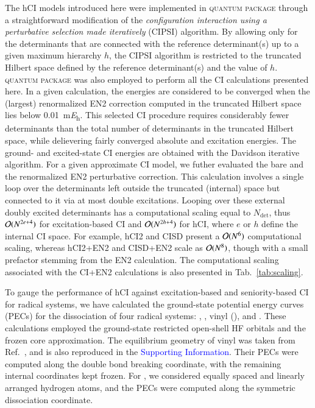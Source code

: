\documentclass[aip,jcp,reprint,noshowkeys,superscriptaddress]{revtex4-1}
\newcommand{\SupInf}{\textcolor{blue}{Supporting Information}}
\newcommand{\QP}{\textsc{quantum package}}
\newcommand{\Ndet}{N_\text{det}}
\begin{document}
The hCI models introduced here were implemented in {\QP} \cite{Garniron_2019} through a straightforward modification of the
\textit{configuration interaction using a perturbative selection made iteratively} (CIPSI) algorithm. \cite{Huron_1973,Giner_2013,Giner_2015,Garniron_2018}
By allowing only for the determinants that are connected with the reference determinant(s) up to a given maximum hierarchy $h$,
the CIPSI algorithm is restricted to the truncated Hilbert space defined by the reference determinant(s) and the value of $h$.
{\QP} \cite{Garniron_2019} was also employed to perform all the CI calculations presented here.
In a given calculation, the energies are considered to be converged when the (largest) renormalized EN2 correction computed in the truncated Hilbert space 
lies below \SI{0.01}{\milli\hartree}. \cite{Garniron_2018}
This selected CI procedure requires considerably fewer determinants than the total number of determinants in the truncated Hilbert space,
while delievering fairly converged absolute and excitation energies.
The ground- and excited-state CI energies are obtained with the Davidson iterative algorithm. \cite{Davidson_1975}
For a given approximate CI model, we futher evaluated the bare and the renormalized EN2 perturbative correction. \cite{Garniron_2019} 
This calculation involves a single loop over the determinants left outside the truncated (internal) space but connected to it via at most double excitations.
Looping over these external doubly excited determinants has a computational scaling equal to $\Ndet$,
thus $\order*{N^{2e+4}}$ for excitation-based CI and $\order*{N^{2h+4}}$ for hCI, where $e$ or $h$ define the internal CI space.
For example, hCI2 and CISD present a $\order*{N^6}$ computational scaling, whereas hCI2+EN2 and CISD+EN2 scale as $\order*{N^8}$,
though with a small prefactor stemming from the EN2 calculation.
The computational scaling associated with the CI+EN2 calculations is also presented in Tab.~\ref{tab:scaling}.

To gauge the performance of hCI against excitation-based and seniority-based CI for radical systems,
we have calculated the ground-state potential energy curves (PECs) for the dissociation of four radical systems:
, , vinyl (), and .
These calculations employed the ground-state restricted open-shell HF orbitals and the frozen core approximation.
The equilibrium geometry of vinyl was taken from Ref.~,
and is also reproduced in the {\SupInf}.
Their PECs were computed along the  double bond breaking coordinate, with the remaining internal coordinates kept frozen.
For , we considered equally spaced and linearly arranged hydrogen atoms, and the PECs were computed along the symmetric dissociation coordinate.
\end{document}
